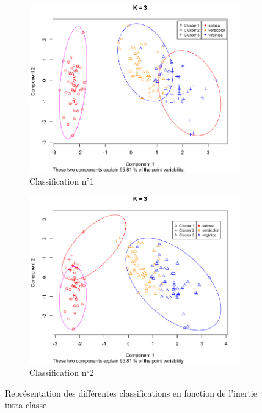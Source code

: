\documentclass[a4paper,10pt]{report}
\begin{document}
\begin{figure}[H]
	\centering
	\captionsetup{justification=centering, margin=3cm}
	\begin{subfigure}[b]{0.5\linewidth}
		\centering
		\captionsetup{justification=centering}
		\includegraphics[width=1\linewidth]{img/3-1-2-iris-kmeans-3-min-inertie}
		\caption{\small Classification n°1}
		\label{fig:3-1-2-iris-kmeans-3-min-inertie}
	\end{subfigure}%
	\begin{subfigure}[b]{0.5\linewidth}
		\centering
		\captionsetup{justification=centering}
		\includegraphics[width=1\linewidth]{img/3-1-2-iris-kmeans-3-max-inertie}
		\caption{\small Classification n°2}
		\label{fig:3-1-2-iris-kmeans-3-max-inertie}
	\end{subfigure}%
	\caption{\small Représentation des différentes classifications en fonction de l'inertie intra-classe}
	\label{fig:3-1-2-Representation-Differentes-classifications-obtenues}
\end{figure}
\end{document}
